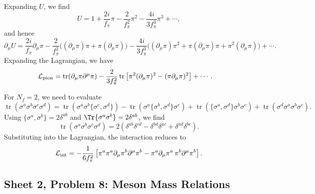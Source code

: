 \begin{solution}
    Expanding $U$, we find
    \begin{equation}
        U = 1+ \frac{2i}{f_\pi}\pi - \frac{2}{f_\pi^2}\pi^2 - \frac{4i}{3f_\pi^3}\pi^3 + \cdots,
    \end{equation}
    and hence
    \begin{equation}
\partial_\mu U
=\frac{2i}{f_\pi}\partial_\mu\pi
-\frac{2}{f_\pi^2}\bigl((\partial_\mu\pi)\pi+\pi(\partial_\mu\pi)\bigr)
-\frac{4i}{3f_\pi^3}\bigl((\partial_\mu\pi)\pi^2+\pi(\partial_\mu\pi)\pi+\pi^2(\partial_\mu\pi)\bigr)
+\cdots.
    \end{equation}
    Expanding the Lagrangian, we have
    \begin{equation}
        \begin{aligned}
            \mathcal L_{\rm pion}
            &=\operatorname{tr}(\partial_\mu \pi\partial^\mu \pi)-\frac{2}{3f_\pi^2}\operatorname{tr}\left[
    \pi^2(\partial_\mu\pi)^2
    -(\pi\partial_\mu\pi)^2\right] +\cdots.
        \end{aligned}
    \end{equation}

    For $N_f = 2$, we need to evaluate
    \begin{equation}
        \operatorname{tr}(\sigma^a \sigma^b \sigma^c \sigma^d ) = \operatorname{tr}(\sigma^a \sigma^b \{\sigma^c, \sigma^d \}) - \operatorname{tr}(\sigma^a \{\sigma^b, \sigma^d\} \sigma^c )  + \operatorname{tr}(\{\sigma^a ,\sigma^d\} \sigma^b \sigma^c ) + \operatorname{tr}( \sigma^d \sigma^a \sigma^b \sigma^c).
    \end{equation}
    Using $\{\sigma^a,\sigma^b\} = 2\delta^{ab}$ and $\Tr{\sigma^a \sigma^b} = 2\delta^{ab}$, we find
    \begin{equation}
        \operatorname{tr}(\sigma^a \sigma^b \sigma^c \sigma^d ) = 2(\delta^{ab}\delta^{cd}-\delta^{bd}\delta^{ac} + \delta^{ad}\delta^{bc}).
    \end{equation}
    Substituting into the Lagrangian, the interaction reduces to
    \begin{equation}
    \mathcal L_{\rm int}=-\frac1{6f_\pi^2}
    \left[\pi^a\pi^a\partial_\mu\pi^b\partial^\mu\pi^b
    -\pi^a\partial_\mu\pi^a\,
    \pi^b\partial^\mu\pi^b\right].
\end{equation}
\end{solution}

\subsection{Sheet 2, Problem 8: Meson Mass Relations}

